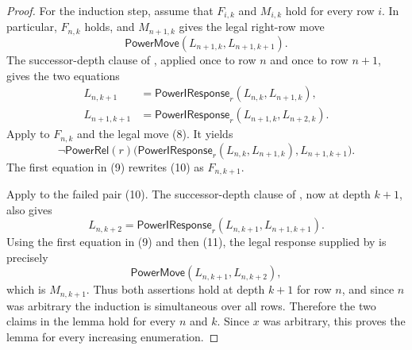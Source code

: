 \begin{proof}
For the induction step, assume that $F_{i,k}$ and $M_{i,k}$ hold for every
row $i$.  In particular, $F_{n,k}$ holds, and $M_{n+1,k}$ gives the legal
right-row move
\[
 \mathsf{PowerMove}(L_{n+1,k},L_{n+1,k+1}).
 \tag{8}
\]
The successor-depth clause of , applied once to
row $n$ and once to row $n+1$, gives the two equations
\[
 \begin{split}
 L_{n,k+1}&=\mathsf{PowerIResponse}_r(L_{n,k},L_{n+1,k}),\\
 L_{n+1,k+1}&=\mathsf{PowerIResponse}_r(L_{n+1,k},L_{n+2,k}).
 \end{split}
 \tag{9}
\]
Apply  to $F_{n,k}$ and the legal move (8).
It yields
\[
 \neg\mathsf{PowerRel}(r)\bigl(
 \mathsf{PowerIResponse}_r(L_{n,k},L_{n+1,k}),L_{n+1,k+1}\bigr).
 \tag{10}
\]
The first equation in (9) rewrites (10) as $F_{n,k+1}$.

Apply  to the failed pair (10).  The
successor-depth clause of , now at depth $k+1$,
also gives
\[
 L_{n,k+2}=\mathsf{PowerIResponse}_r(L_{n,k+1},L_{n+1,k+1}).
 \tag{11}
\]
Using the first equation in (9) and then (11), the legal response supplied
by  is precisely
\[
 \mathsf{PowerMove}(L_{n,k+1},L_{n,k+2}),
\]
which is $M_{n,k+1}$.  Thus both assertions hold at depth $k+1$ for row
$n$, and since $n$ was arbitrary the induction is simultaneous over all
rows.  Therefore the two claims in the lemma hold for every $n$ and $k$.
Since $x$ was arbitrary, this proves the lemma for every increasing
enumeration.
\end{proof}
